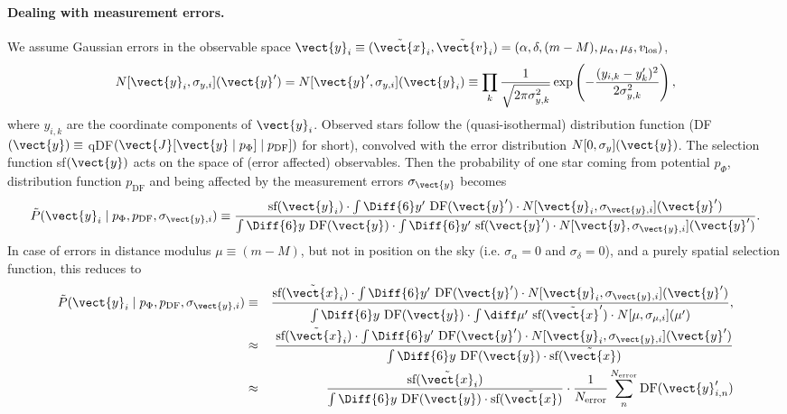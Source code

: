 
\paragraph{Dealing with measurement errors.} 

We assume Gaussian errors in the observable space $\vect{y}_i \equiv (\tilde{\vect{x}}_i,\tilde{\vect{v}}_i)=(\alpha,\delta,(m-M),\mu_\alpha,\mu_\delta,v_\text{los})$,
\begin{equation*}
N[\vect{y}_i,\sigma_{y,i}](\vect{y}') = N[\vect{y}',\sigma_{y,i}](\vect{y}_i) \equiv  \prod_k \frac{1}{\sqrt{2\pi\sigma_{y,k}^2}} \exp\left( -\frac{(y_{i,k}-y_k')^2}{2\sigma_{y,k}^2}\right),
\end{equation*}
where $y_{i,k}$ are the coordinate components of $\vect{y}_i$. Observed stars follow the (quasi-isothermal) distribution function (DF$(\vect{y}) \equiv$ qDF$(\vect{J}[\vect{y} \mid p_\Phi] \mid p_\text{DF}])$ for short), convolved with the error distribution $N[0,\sigma_{y}](\vect{y})$. The selection function sf$(\vect{y})$ acts on the space of (error affected) observables. 
Then the probability of one star coming from potential $p_\Phi$, distribution function $p_\text{DF}$ and being affected by the measurement errors $\sigma_{\vect{y}}$ becomes
\begin{eqnarray*}
\tilde{P}(\vect{y}_i \mid p_\Phi,p_\text{DF},\sigma_{\vect{y},i}) \equiv \frac{\text{sf}(\vect{y}_i) \cdot \int \Diff{6} y' \  \text{DF}(\vect{y}') \cdot N[\vect{y}_i,\sigma_{\vect{y},i}](\vect{y}')}{\int \Diff{6}y  \  \text{DF}(\vect{y})  \cdot  \int \Diff{6} y' \  \text{sf}(\vect{y}')  \cdot N[\vect{y},\sigma_{\vect{y},i}](\vect{y}')}.
\end{eqnarray*}
In case of errors in distance modulus $\mu \equiv (m-M)$, but not in position on the sky (i.e. $\sigma_\alpha = 0$ and $\sigma_\delta = 0$), and a purely spatial selection function, this reduces to
\begin{eqnarray}
\tilde{P}(\vect{y}_i \mid p_\Phi,p_\text{DF},\sigma_{\vect{y},i}) &\equiv& \frac{\text{sf}(\tilde{\vect{x}}_i) \cdot \int \Diff{6} y' \  \text{DF}(\vect{y}') \cdot N[\vect{y}_i,\sigma_{\vect{y},i}](\vect{y}')}{\int \Diff{6}y  \  \text{DF}(\vect{y})  \cdot  \int \diff \mu' \  \text{sf}(\tilde{\vect{x}}')  \cdot N[\mu,\sigma_{\mu,i}](\mu')},\nonumber\\
&\approx& \frac{\text{sf}(\tilde{\vect{x}}_i) \cdot \int \Diff{6} y' \  \text{DF}(\vect{y}') \cdot N[\vect{y}_i,\sigma_{\vect{y},i}](\vect{y}')}{\int \Diff{6}y  \  \text{DF}(\vect{y})  \cdot   \text{sf}(\tilde{\vect{x}})}\label{eq:errapprox}\\
&\approx& \frac{ \text{sf}(\tilde{\vect{x}}_i)}{\int \Diff{6}y  \  \text{DF}(\vect{y})  \cdot   \text{sf}(\tilde{\vect{x}})} \cdot \frac{1}{N_\text{error}} \sum_n^{N_\text{error}}  \text{DF}(\vect{y}'_{i,n}) \label{eq:errMC}
\end{eqnarray}
